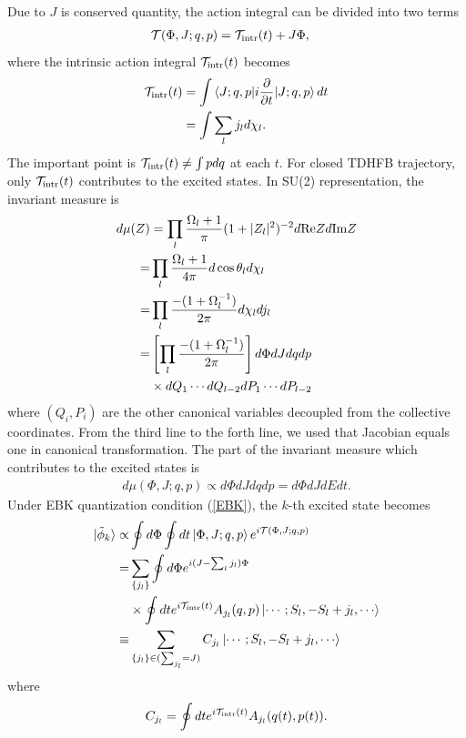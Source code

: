 \documentclass[%
superscriptaddress,
showpacs,
nofootinbib,
amsmath,amssymb,
aps,
prc,
twocolumn,
floatfix ]%
{revtex4-1}
\begin{document}
Due to $J$ is conserved quantity, the action integral can be divided into two terms
\begin{align}
  \mathcal{T}(\Phi,J;q,p) &= \mathcal{T}_{\rm intr}(t) + J\Phi, 
\end{align}
where the intrinsic action integral $\mathcal{T}_{\rm intr}(t)$ becomes
\begin{align}
  \mathcal{T}_{\rm intr}(t) &= \int \braket{J;q,p|i\frac{\partial}{\partial t}|J;q,p} dt
	 \nonumber \\
	&= \int \sum_l j_l d\chi_l .
	\label{tau}
\end{align}
The important point is $\mathcal{T}_{\rm intr}(t) \ne \int p dq$ at each $t$. For closed TDHFB trajectory, only $\mathcal{T}_{\rm intr}(t)$ contributes to the excited states.
In SU(2) representation, the invariant measure is
\begin{align}
  d\mu(Z) &= \prod_l \frac{\Omega_l+1}{\pi} (1+|Z_l|^2)^{-2} d{\rm Re}Z d{\rm Im}Z \nonumber \\
 =& \prod_l \frac{\Omega_l+1}{4\pi} d \cos{\theta_l} d\chi_l \nonumber \\
 =& \prod_l \frac{-(1+\Omega_l^{-1})}{2\pi} d\chi_l dj_l \nonumber \\
 =& \left[ \prod_l \frac{-(1+\Omega_l^{-1})}{2\pi} \right] d\Phi dJ dqdp \nonumber \\
 &\times dQ_1\cdots dQ_{l-2}dP_1\cdots dP_{l-2}
\end{align}
where $(Q_i,P_i)$ are the other canonical variables decoupled from the collective coordinates. From the third line to the forth line, we used that Jacobian equals one in canonical transformation. The part of the invariant measure which contributes to the excited states is
\begin{align}
d\mu(\Phi,J;q,p) \propto d\Phi dJ dqdp = d\Phi dJ dE dt. 
\end{align}
Under EBK quantization condition (\ref{EBK}),
the $k$-th excited state becomes
\begin{align}
 \ket{\tilde{\phi}_k} \propto& \oint d\Phi \oint dt \ket{\Phi,J;q,p} e^{i\mathcal{T}(\Phi,J;q,p)}
 \nonumber \\
 =& \sum_{\{j_l\}} \oint d\Phi e^{i(J-\sum_l j_l)\Phi} \nonumber \\
 &\times \oint dt e^{i\mathcal{T}_{\rm intr}(t)} A_{j_l}(q,p) \ket{\cdots;S_l,-S_l+j_l,\cdots} \nonumber \\
 \equiv& \sum_{\{j_l\}\in (\sum_{j_l}=J)} C_{j_l} \ket{\cdots;S_l,-S_l+j_l,\cdots}
 \label{SPA2}
\end{align}
where
\begin{align}
  C_{j_l} = \oint dt e^{i\mathcal{T}_{\rm intr}(t)} A_{j_l}(q(t),p(t)).
  \label{coef}
\end{align}
\end{document}
